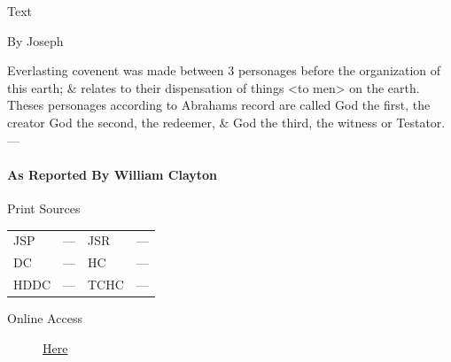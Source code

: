 				
				\begin{description}
					\item[Text]
				\end{description}
				
					\begin{tightcenter}
						By Joseph
					\end{tightcenter}
					
					Everlasting covenent was made between 3 personages before the organization of this earth; \& relates to their dispensation of things <to men> on the earth. Theses personages according to Abrahams record are called God the first, the creator God the second, the redeemer, \& God the third, the witness or Testator.---
					
			\paragraph{As Reported By William Clayton}
				\label{EMS-1841-JS-CIR-MAY-1841-WC}
				
				\begin{description}
					\item[Print Sources]
				\end{description}

				\begin{tabular}{p{0.5in}p{1in}p{0.5in}p{1in}}
					JSP	 	& ---		& JSR 		& --- \\
					DC	 	& ---		& HC 		& --- \\
					HDDC 	& ---		& TCHC 		& --- \\
				\end{tabular}
				
				\begin{description}
					\item[Online Access] \href{https://www.josephsmithpapers.org/paper-summary/discourse-circa-may-1841-as-reported-by-william-clayton/1}{Here}
				\end{description}
				
